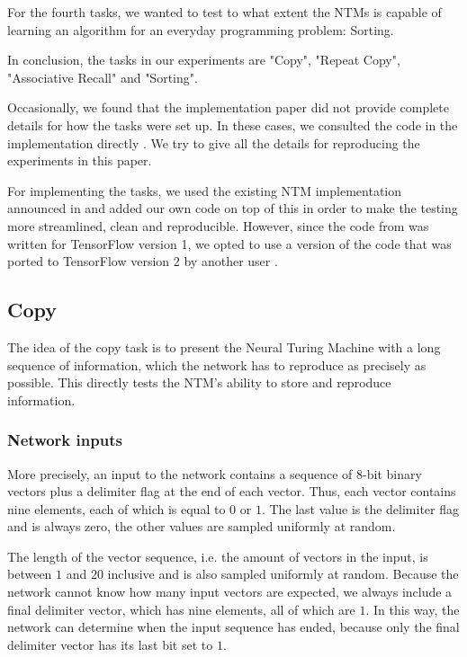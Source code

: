 \documentclass[12pt,twoside]{article}
\theoremstyle{plain}
\theoremstyle{definition}
\theoremstyle{remark}
\begin{document}
For the fourth tasks, we wanted to test to what extent the NTMs is capable of learning an algorithm for an everyday programming problem: Sorting.

In conclusion, the tasks in our experiments are "Copy", "Repeat Copy", "Associative Recall" and "Sorting".

Occasionally, we found that the implementation paper \cite{implementing-ntm} did not provide complete details for how the tasks were set up. In these cases, we consulted the code in the implementation directly \cite{ntm-github}. We try to give all the details for reproducing the experiments in this paper.

For implementing the tasks, we used the existing NTM implementation announced in \cite{implementing-ntm} and added our own code on top of this in order to make the testing more streamlined, clean and reproducible. However, since the code from \cite{implementing-ntm} was written for TensorFlow version 1, we opted to use a version of the code that was ported to TensorFlow version 2 by another user \cite{ntm-tf2-github}.

\subsection{Copy}
The idea of the copy task is to present the Neural Turing Machine with a long sequence of information, which the network has to reproduce as precisely as possible. This directly tests the NTM's ability to store and reproduce information.

\subsubsection{Network inputs}\label{sc-copy-inputs}
More precisely, an input to the network contains a sequence of 8-bit binary vectors plus a delimiter flag at the end of each vector. Thus, each vector contains nine elements, each of which is equal to $0$ or $1$. The last value is the delimiter flag and is always zero, the other values are sampled uniformly at random.

The length of the vector sequence, i.e. the amount of vectors in the input, is between $1$ and $20$ inclusive and is also sampled uniformly at random. Because the network cannot know how many input vectors are expected, we always include a final delimiter vector, which has nine elements, all of which are $1$. In this way, the network can determine when the input sequence has ended, because only the final delimiter vector has its last bit set to $1$.
\end{document}
